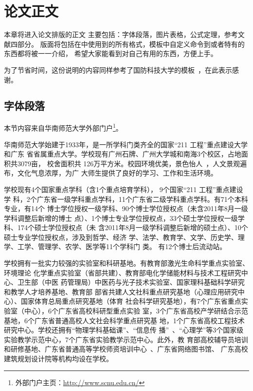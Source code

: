 \chapter{论文正文}
\label{chap:main}
本章将进入论文排版的正文
主要包括：字体段落，图片表格，公式定理，参考文献四部分。
版面将包括在\scnuthesis{}中使用到的所有格式，模板中自定义命令到或者特有的东西都将被一一介绍，
希望大家能看到对自己有用的东西，方便上手。

为了节省时间，这份说明的内容同样参考了国防科技大学的\nudtpaper{}模板~，在此表示感谢。

\section{字体段落}
\label{sec:font}

本节内容来自华南师范大学外部门户\footnote{外部门户主页：\url{http://www.scnu.edu.cn/}}。

华南师范大学始建于1933年，是一所学科门类齐全的国家“211 工程”重点建设大学和广东%
省省属重点大学。学校现有广州石牌、广州大学城和南海3个校区，占地面积共3079亩，%
校舍面积共 126万平方米。校园环境优美，景色怡人~，人文景观遍布，文化气息浓厚，为广%
大师生提供了良好的学习、工作和生活环境。

学校现有4个国家重点学科（含1个重点培育学科）， 9个国家“211 工程”重点建设学%
科，2个广东省一级学科重点学科，11个广东省二级学科重点学科。有71个本科专业，有14个%
博士学位授权一级学科、90个博士学位授权点（未含2011年8月一级学科调整后新增的博士%
点）、1个博士专业学位授权点，33个硕士学位授权一级学科、174个硕士学位授权点（未%
含2011年8月一级学科调整后新增的硕士点）、10个硕士专业学位授权点，涉及到哲学、经济%
学、法学、教育学、文学、历史学、理学、工学、管理学、农学、医学等11个学科门%
类。 有12个博士后流动站。

学校拥有一批实力较强的实验室和科研基地。有教育部激光生命科学重点实验室、环境理论
化学重点实验室（省部共建）、教育部电化学储能材料与技术工程研究中心、卫生部（中医
药管理局）中医药与光子技术实验室、国家理科基础科学研究和教学人才培养基地、教育部
部省共建人文社科重点研究基地（心理应用研究中心）、国家体育总局重点研究基地（体育
社会科学研究基地），有7个广东省重点实验室（中心），6个广东省高校科研型重点实验
室，3个广东省高校产学研结合示范基地，6个广东省普通高校人文社会科学重点研究基
地，1个广东省高校工程技术研究中心。学校还拥有“物理学科基础课”、“信息传
播”~、“心理学”等3个国家级实验教学示范中心，7个广东省实验教学示范中心。此外，教
育部高校辅导员培训和研修基地、广东省普通高等学校师资培训中心~、广东省网络图书馆、
广东高校建筑规划设计院等机构均设在学校。

